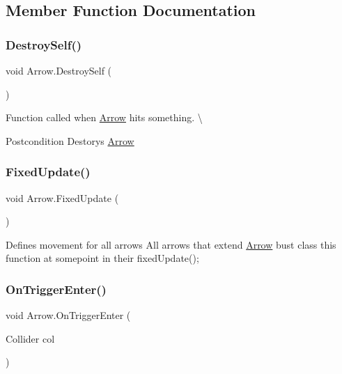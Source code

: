 \subsection{Member Function Documentation}
\mbox{\label{class_arrow_a87945ea993d85a6e1d1a59cd10b2358e}} 
\subsubsection{\texorpdfstring{Destroy\+Self()}{DestroySelf()}}
{\footnotesize\ttfamily void Arrow.\+Destroy\+Self (\begin{DoxyParamCaption}{ }\end{DoxyParamCaption})\hspace{0.3cm}{\ttfamily [private]}}

Function called when \hyperlink{class_arrow}{Arrow} hits something. \textbackslash{} \begin{DoxyPostcond}{Postcondition}
Destorys \hyperlink{class_arrow}{Arrow} 
\end{DoxyPostcond}
\mbox{\label{class_arrow_aaf1023833f6420f4920d9013f9c46ef3}} 
\subsubsection{\texorpdfstring{Fixed\+Update()}{FixedUpdate()}}
{\footnotesize\ttfamily void Arrow.\+Fixed\+Update (\begin{DoxyParamCaption}{ }\end{DoxyParamCaption})}

Defines movement for all arrows All arrows that extend \hyperlink{class_arrow}{Arrow} bust class this function at somepoint in their fixed\+Update(); \mbox{\label{class_arrow_a186cf27bfba2bb5ce6b6427a44889858}} 
\subsubsection{\texorpdfstring{On\+Trigger\+Enter()}{OnTriggerEnter()}}
{\footnotesize\ttfamily void Arrow.\+On\+Trigger\+Enter (\begin{DoxyParamCaption}\item[{Collider}]{col }\end{DoxyParamCaption})\hspace{0.3cm}{\ttfamily [private]}}

